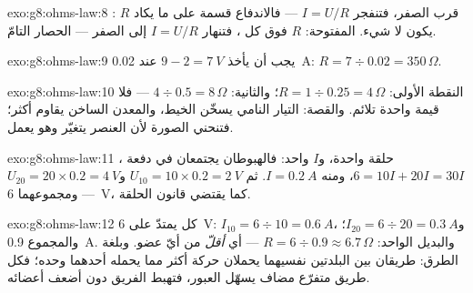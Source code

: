 \begin{solution}{exo:g8:ohms-law:8}
: $R$ قرب الصفر، فتنفجر $I = U/R$ --- فالاندفاع
قسمة على ما يكاد يكون لا شيء.  المفتوحة: $R$ فوق كل
، فتنهار $I = U/R$ إلى الصفر --- الحصار التامّ.
\end{solution}

\begin{solution}{exo:g8:ohms-law:9}
يجب أن يأخذ  $9 - 2 = \qty{7}{V}$ عند \qty{0.02}{A}:
$R = 7 \div 0.02 = 350\,\Omega$.
\end{solution}

\begin{solution}{exo:g8:ohms-law:10}
النقطة الأولى: $R = 1 \div 0.25 = 4\,\Omega$؛ والثانية:
$4 \div 0.5 = 8\,\Omega$ --- فلا قيمة واحدة تلائم. والقصة:
التيار النامي يسخّن الخيط، والمعدن الساخن يقاوم أكثر؛
فتنحني الصورة لأن العنصر يتغيّر وهو يعمل.
\end{solution}

\begin{solution}{exo:g8:ohms-law:11}
حلقة واحدة، و$I$ واحد: فالهبوطان يجتمعان في دفعة ،
$6 = 10 I + 20 I = 30 I$، ومنه $I = \qty{0.2}{A}$. ثم
$U_{10} = 10 \times 0.2 = \qty{2}{V}$ و$U_{20} = 20 \times 0.2
= \qty{4}{V}$ --- ومجموعهما \qty{6}{V}، كما يقتضي قانون
الحلقة.
\end{solution}

\begin{solution}{exo:g8:ohms-law:12}
كل  يمتدّ على \qty{6}{V}: $I_{10} = 6 \div 10 =
\qty{0.6}{A}$، و$I_{20} = 6 \div 20 = \qty{0.3}{A}$؛ والمجموع
\qty{0.9}{A}. والبديل الواحد: $R = 6 \div 0.9 \approx
6.7\,\Omega$ --- أي \emph{أقلّ} من أيّ عضو. وبلغة الطرق:
طريقان بين البلدتين نفسيهما يحملان حركة أكثر مما يحمله أحدهما
وحده؛ فكل طريق متفرّع مضاف يسهّل العبور، فتهبط  الفريق
دون  أضعف أعضائه.
\end{solution}

